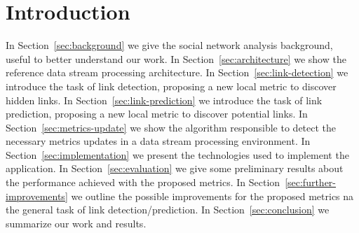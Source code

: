 \section{Introduction}
\label{sec:introduction}

In Section~\ref{sec:background} we give the social network analysis background, useful to better understand our work.
In Section~\ref{sec:architecture} we show the reference data stream processing architecture.
In Section~\ref{sec:link-detection} we introduce the task of link detection, proposing a new local metric to discover hidden links.
In Section~\ref{sec:link-prediction} we introduce the task of link prediction, proposing a new local metric to discover potential links.
In Section~\ref{sec:metrics-update} we show the algorithm responsible to detect the necessary metrics updates in a data stream processing environment.
In Section~\ref{sec:implementation} we present the technologies used to implement the application.
In Section~\ref{sec:evaluation} we give some preliminary results about the performance achieved with the proposed metrics.
In Section~\ref{sec:further-improvements} we outline the possible improvements for the proposed metrics na the general task of link detection/prediction.
In Section~\ref{sec:conclusion} we summarize our work and results.

